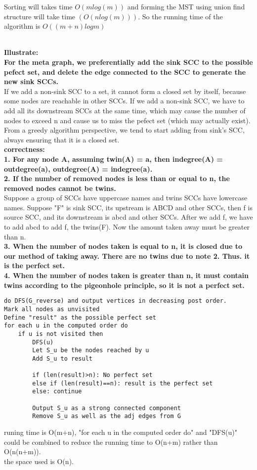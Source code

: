 \documentclass[12pt,a4paper]{article}
\newcommand{\question}[1]{\bigskip\noindent{\textbf{Q{#1} solution}}}
\begin{document}
Sorting will takes time $O(mlog(m))$ and forming the MST using union find structure will take time $(O(nlog(m)))$. So the running time of the algorithm is $O((m+n)logm)$

\question{30}\\
\textbf{Illustrate:}\\
\textbf{For the meta graph, we preferentially add the sink SCC to the possible pefect set, and delete the edge connected to the SCC to generate the new sink SCCs.}\\
If we add a non-sink SCC to a set, it cannot form a closed set by itself, because some nodes are reachable in other SCCs. If we add a non-sink SCC, we have to add all its downstream SCCs at the same time, which may cause the number of nodes to exceed n and cause us to miss the pefect set (which may actually exist). From a greedy algorithm perspective, we tend to start adding from sink's SCC, always ensuring that it is a closed set.\\
\textbf{correctness:}\\
\textbf{1. For any node A, assuming twin(A) = a, then indegree(A) = outdegree(a), outdegree(A) = indegree(a).}\\
\textbf{2. If the number of removed nodes is less than or equal to n, the removed nodes cannot be twins.}\\
Suppose a group of SCCs have uppercase names and twins SCCs have lowercase names. Suppose "F" is sink SCC, its upstream is ABCD and other SCCs, then f is source SCC, and its downstream is abcd and other SCCs. After we add f, we have to add abcd to add f, the twins(F). Now the amount taken away must be greater than n.\\
\textbf{3. When the number of nodes taken is equal to n, it is closed due to our method of taking away. There are no twins due to note 2. Thus. it is the perfect set.}\\
\textbf{4. When the number of nodes taken is greater than n, it must contain twins according to the pigeonhole principle, so it is not a perfect set.}\\
\begin{lstlisting}
do DFS(G_reverse) and output vertices in decreasing post order.
Mark all nodes as unvisited
Define "result" as the possible perfect set
for each u in the computed order do
	if u is not visited then
		DFS(u)
		Let S_u be the nodes reached by u
		Add S_u to result 

		if (len(result)>n): No perfect set
		else if (len(result)==n): result is the perfect set
		else: continue

		Output S_u as a strong connected component
		Remove S_u as well as the adj edges from G
\end{lstlisting}
runing time is O(m+n), "for each u in the computed order do" and "DFS(u)" could be combined to reduce the running time to O(n+m) rather than O(n(n+m)).\\
the space used is O(n).\\
\end{document}
